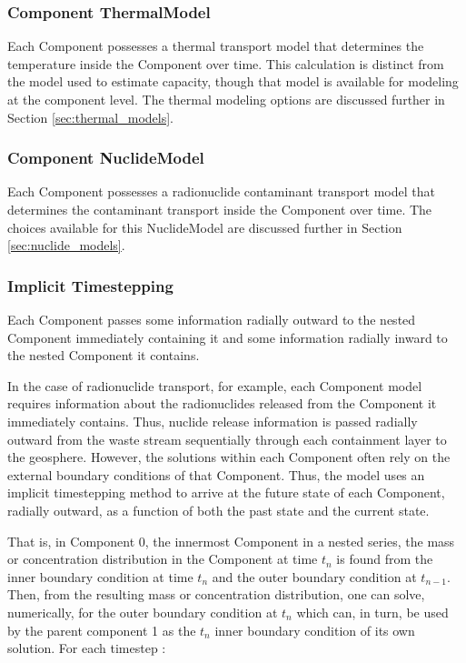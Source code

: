 \subsubsection{Component ThermalModel}

Each Component possesses a thermal transport model that determines the 
temperature inside the Component over time. This calculation is distinct from 
the model used to estimate capacity, though that model is  available for 
modeling at the component level. The thermal modeling options are discussed 
further in Section \ref{sec:thermal_models}.  

\subsubsection{Component NuclideModel}

Each Component possesses a radionuclide contaminant transport model that 
determines the contaminant transport inside the Component over time. The 
choices available for this NuclideModel are discussed further in Section 
\ref{sec:nuclide_models}. 

\subsubsection{Implicit Timestepping}

Each Component passes some information radially outward to the nested 
Component immediately containing it and some information radially 
inward to the nested Component it contains. 


In the case of radionuclide transport, for example, each Component model
requires information about the radionuclides released from the Component it
immediately contains.  Thus, nuclide release information is passed radially
outward from the waste stream sequentially through each containment layer to
the geosphere. However, the solutions within each Component often rely on the
external boundary conditions of that Component.  Thus, the \Cyder model uses an
implicit timestepping method to arrive at the future state of each Component,
radially outward, as a function of both the past state and the current state. 

That is, in Component 0, the innermost Component in a nested series, the mass or concentration 
distribution in the Component at time $t_n$ is found from the inner boundary 
condition at time $t_n$ and the outer boundary condition at $t_{n-1}$. Then, from 
the resulting mass or concentration distribution, one can solve, numerically, for 
the outer boundary condition at $t_n$ which can, in turn, be used by the parent 
component 1 as the $t_n$ inner boundary condition of its own solution. For each timestep :

